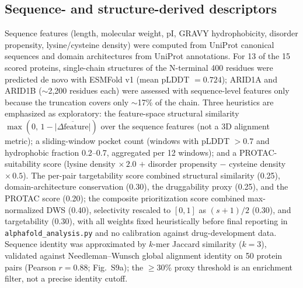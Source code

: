 \documentclass[11pt,a4paper]{article}
\begin{document}
\subsection{Sequence- and structure-derived descriptors}
Sequence features (length, molecular weight, pI, GRAVY hydrophobicity, disorder propensity, lysine/cysteine density) were computed from UniProt canonical sequences and domain architectures from UniProt annotations. For 13 of the 15 scored proteins, single-chain structures of the N-terminal 400 residues were predicted de novo with ESMFold v1 (mean pLDDT $=0.724$); ARID1A and ARID1B ($\sim$2,200 residues each) were assessed with sequence-level features only because the truncation covers only $\sim$17\% of the chain. Three heuristics are emphasized as exploratory: the feature-space structural similarity $\max(0,\,1-\overline{|\Delta\text{feature}|})$ over the sequence features (not a 3D alignment metric); a sliding-window pocket count (windows with pLDDT $>0.7$ and hydrophobic fraction 0.2--0.7, aggregated per 12 windows); and a PROTAC-suitability score (lysine density $\times\,2.0$ $+$ disorder propensity $-$ cysteine density $\times\,0.5$). The per-pair targetability score combined structural similarity (0.25), domain-architecture conservation (0.30), the druggability proxy (0.25), and the PROTAC score (0.20); the composite prioritization score combined max-normalized DWS (0.40), selectivity rescaled to $[0,1]$ as $(s+1)/2$ (0.30), and targetability (0.30), with all weights fixed heuristically before final reporting in \texttt{alphafold\_analysis.py} and no calibration against drug-development data. Sequence identity was approximated by $k$-mer Jaccard similarity ($k=3$), validated against Needleman--Wunsch global alignment identity on 50 protein pairs (Pearson $r=0.88$; Fig.~S9a); the $\ge$30\% proxy threshold is an enrichment filter, not a precise identity cutoff.
\end{document}
